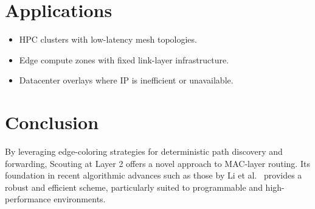 \documentclass[../../../OAE-SPEC-MAIN.tex]{subfiles}
\begin{document}
\section{Applications}

\begin{itemize}
    \item HPC clusters with low-latency mesh topologies.
    \item Edge compute zones with fixed link-layer infrastructure.
    \item Datacenter overlays where IP is inefficient or unavailable.
\end{itemize}

\section{Conclusion}

By leveraging edge-coloring strategies for deterministic path discovery and forwarding, Scouting at Layer 2 offers a novel approach to MAC-layer routing. Its foundation in recent algorithmic advances such as those by Li et al.~\cite{li2024vizing} provides a robust and efficient scheme, particularly suited to programmable and high-performance environments.
\end{document}
